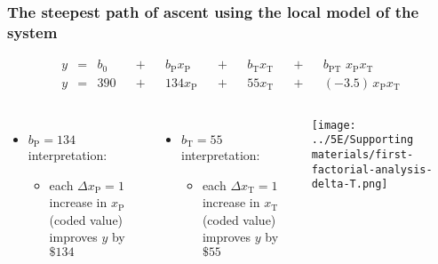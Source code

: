 \begin{frame}\frametitle{The steepest {\color{myOrange}path of ascent} using the local model of the system}

	\begin{exampleblock}{}
		\begin{align*} 
			y &=& b_0 &&+&& b_\text{P} x_\text{P} &&+&& b_\text{T} x_\text{T} &&+&& b_\text{PT}\,\,x_\text{P}x_\text{T} \\
			y &=& 390 &&+&& 134 x_\text{P}        &&+&& 55 x_\text{T}         &&+&& (-3.5)\,x_\text{P}x_\text{T} 
		\end{align*}		
	\end{exampleblock}
	
	\begin{columns}[c]
			\begin{itemize}
				\item	$b_\text{P} =134$ interpretation:
				\begin{itemize}
					\item	each $\Delta x_\text{P} = 1$ increase in $x_\text{P}$ (coded value) improves $y$ by $\$134$
				\end{itemize}
			\end{itemize}
			\pause
			\begin{itemize}
				\item	$b_\text{T} = 55$ interpretation:
				\begin{itemize}
					\item	each $\Delta x_\text{T} = 1$ increase in $x_\text{T}$ (coded value)  improves $y$ by $\$55$
				\end{itemize}
			\end{itemize}
			\centerline{\texttt{[image: ../5E/Supporting materials/first-factorial-analysis-delta-T.png]}}
	\end{columns}
\end{frame}

